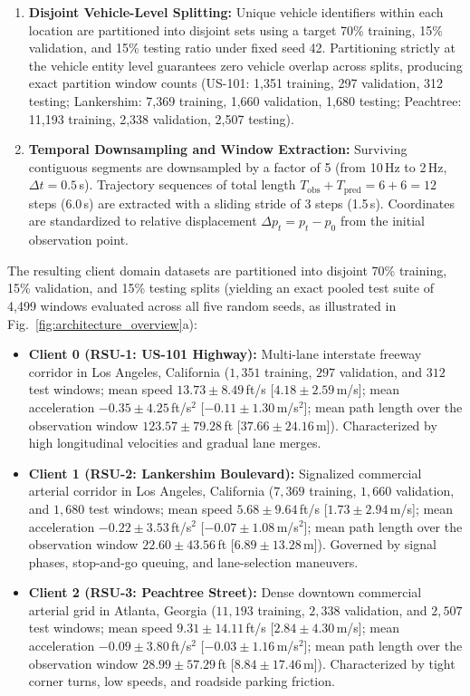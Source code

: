 \documentclass[journal]{IEEEtran}
\begin{document}
\begin{enumerate}
    \item \textbf{Disjoint Vehicle-Level Splitting:} Unique vehicle identifiers within each location are partitioned into disjoint sets using a target 70\% training, 15\% validation, and 15\% testing ratio under fixed seed 42. Partitioning strictly at the vehicle entity level guarantees zero vehicle overlap across splits, producing exact partition window counts (US-101: 1,351 training, 297 validation, 312 testing; Lankershim: 7,369 training, 1,660 validation, 1,680 testing; Peachtree: 11,193 training, 2,338 validation, 2,507 testing).
    \item \textbf{Temporal Downsampling and Window Extraction:} Surviving contiguous segments are downsampled by a factor of 5 (from 10\,Hz to 2\,Hz, $\Delta t = 0.5$\,s). Trajectory sequences of total length $T_{\mathrm{obs}} + T_{\mathrm{pred}} = 6 + 6 = 12$ steps (6.0\,s) are extracted with a sliding stride of 3 steps (1.5\,s). Coordinates are standardized to relative displacement $\Delta p_t = p_t - p_0$ from the initial observation point.
\end{enumerate}

The resulting client domain datasets are partitioned into disjoint 70\% training, 15\% validation, and 15\% testing splits (yielding an exact pooled test suite of 4,499 windows evaluated across all five random seeds, as illustrated in Fig.~\ref{fig:architecture_overview}a):
\begin{itemize}
    \item \textbf{Client 0 (RSU-1: US-101 Highway):} Multi-lane interstate freeway corridor in Los Angeles, California ($1,351$ training, $297$ validation, and $312$ test windows; mean speed $13.73 \pm 8.49$\,ft/s [$4.18 \pm 2.59$\,m/s]; mean acceleration $-0.35 \pm 4.25$\,ft/s$^2$ [$-0.11 \pm 1.30$\,m/s$^2$]; mean path length over the observation window $123.57 \pm 79.28$\,ft [$37.66 \pm 24.16$\,m]). Characterized by high longitudinal velocities and gradual lane merges.
    \item \textbf{Client 1 (RSU-2: Lankershim Boulevard):} Signalized commercial arterial corridor in Los Angeles, California ($7,369$ training, $1,660$ validation, and $1,680$ test windows; mean speed $5.68 \pm 9.64$\,ft/s [$1.73 \pm 2.94$\,m/s]; mean acceleration $-0.22 \pm 3.53$\,ft/s$^2$ [$-0.07 \pm 1.08$\,m/s$^2$]; mean path length over the observation window $22.60 \pm 43.56$\,ft [$6.89 \pm 13.28$\,m]). Governed by signal phases, stop-and-go queuing, and lane-selection maneuvers.
    \item \textbf{Client 2 (RSU-3: Peachtree Street):} Dense downtown commercial arterial grid in Atlanta, Georgia ($11,193$ training, $2,338$ validation, and $2,507$ test windows; mean speed $9.31 \pm 14.11$\,ft/s [$2.84 \pm 4.30$\,m/s]; mean acceleration $-0.09 \pm 3.80$\,ft/s$^2$ [$-0.03 \pm 1.16$\,m/s$^2$]; mean path length over the observation window $28.99 \pm 57.29$\,ft [$8.84 \pm 17.46$\,m]). Characterized by tight corner turns, low speeds, and roadside parking friction.
\end{itemize}
\end{document}
